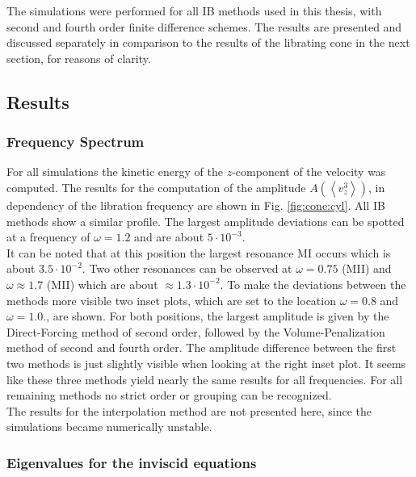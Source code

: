 The simulations were performed for all IB methods used in this thesis, with second and fourth order finite difference schemes.
The results are presented and discussed separately in comparison to the results of the librating cone in the next section, for reasons of clarity.

\clearpage


\subsection{Results}
\subsubsection{Frequency Spectrum}

For all simulations the kinetic energy of the $z$-component of the velocity was computed.
The results for the computation of the amplitude $A\left(\left<v_z^3\right>\right)$, in dependency of the libration
frequency are shown in Fig. \ref{fig:cone:cyl}.
All IB methods show a similar profile.
The largest amplitude deviations can be spotted at a frequency of $\omega=1.2$ and are about $5\cdot10^{-3}$.\\
It can be noted that at this position the largest resonance M\RN{1} occurs which is about $3.5\cdot10^{-2}$.
Two other resonances can be observed at $\omega=0.75$ (M\RN{2}) and $\omega\approx1.7$ (M\RN{2}) which are
about ${\approx1.3\cdot10^{-2}}$.
To make the deviations between the methods more visible two inset plots, which are
set to the location $\omega=0.8$ and $\omega=1.0$., are shown.
For both positions, the largest amplitude is given by the Direct-Forcing method of second order, followed by
the Volume-Penalization method of second and fourth order.
The amplitude difference between the first two methods is just slightly visible when looking at the right inset plot.
It seems like these three methods yield nearly the same results for all frequencies.
For all remaining methods  no strict order or grouping can be recognized.\\
The results for the interpolation method are not presented here, since the simulations became numerically unstable.

\subsubsection{Eigenvalues for the inviscid equations}


